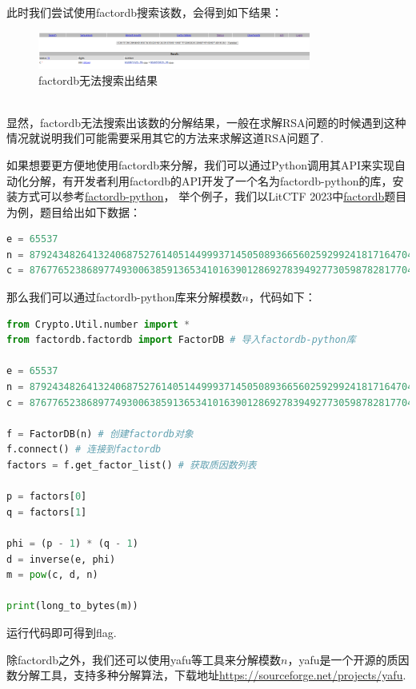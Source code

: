\documentclass{book}
\numberwithin{equation}{subsubsection}
\begin{document}
此时我们尝试使用factordb搜索该数，会得到如下结果：\\
\begin{figure}[h!]
    \centering
    \includegraphics[width=0.8\textwidth]{Picture/factordb_factor_not_found.png}
    \caption{factordb无法搜索出结果}
\end{figure}\\
显然，factordb无法搜索出该数的分解结果，一般在求解RSA问题的时候遇到这种情况就说明我们可能需要采用其它的方法来求解这道RSA问题了.\par
如果想要更方便地使用factordb来分解，我们可以通过Python调用其API来实现自动化分解，有开发者利用factordb的API开发了一个名为factordb-python的库，安装方式可以参考\href{https://pypi.org/project/factordb-python/}{factordb-python}，
举个例子，我们以LitCTF 2023中\href{https://www.nssctf.cn/problem/3893}{factordb}题目为例，题目给出如下数据：
\begin{lstlisting}[language=Python,basicstyle=\ttfamily,breaklines=true,keywordstyle=\bfseries\color{blue}]
e = 65537
n = 87924348264132406875276140514499937145050893665602592992418171647042491658461
c = 87677652386897749300638591365341016390128692783949277305987828177045932576708
\end{lstlisting}
那么我们可以通过factordb-python库来分解模数$n$，代码如下：
\begin{lstlisting}[language=Python,basicstyle=\ttfamily,breaklines=true,keywordstyle=\bfseries\color{blue}]
from Crypto.Util.number import *
from factordb.factordb import FactorDB # 导入factordb-python库

e = 65537
n = 87924348264132406875276140514499937145050893665602592992418171647042491658461
c = 87677652386897749300638591365341016390128692783949277305987828177045932576708

f = FactorDB(n) # 创建factordb对象
f.connect() # 连接到factordb
factors = f.get_factor_list() # 获取质因数列表

p = factors[0]
q = factors[1]

phi = (p - 1) * (q - 1)
d = inverse(e, phi)
m = pow(c, d, n)

print(long_to_bytes(m))
\end{lstlisting}
运行代码即可得到flag.\par
除factordb之外，我们还可以使用yafu等工具来分解模数$n$，yafu是一个开源的质因数分解工具，支持多种分解算法，下载地址\href{https://sourceforge.net/projects/yafu/}{https://sourceforge.net/projects/yafu}.\par
\end{document}

